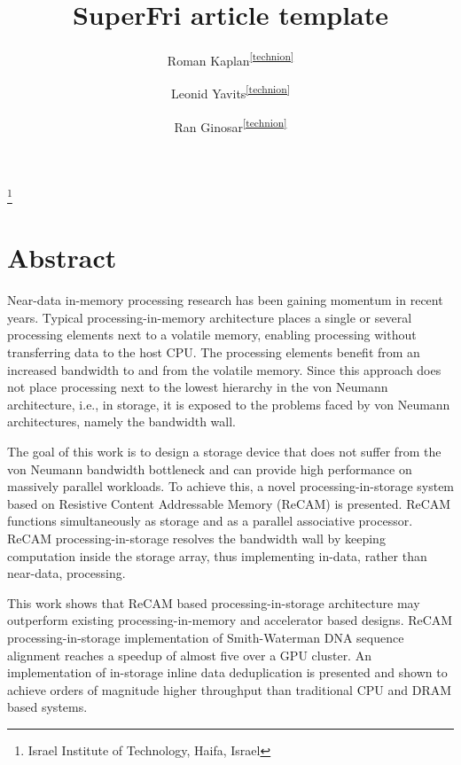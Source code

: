 \documentclass{superfri}
\begin{document}
\footnote{\label{technion}Israel Institute of Technology, Haifa, Israel}
\author{Roman Kaplan\textsuperscript{\ref{technion}} \and Leonid Yavits\textsuperscript{\ref{technion}} \and Ran Ginosar\textsuperscript{\ref{technion}}}

\title{SuperFri article template}

\maketitle{}

\begin{abstract}

\end{abstract}

\section*{Abstract}
\label{sec:abstract}
Near-data in-memory processing research has been gaining momentum in recent years. Typical processing-in-memory architecture places a single or several processing elements next to a volatile memory, enabling processing without transferring data to the host CPU. The processing elements benefit from an increased bandwidth to and from the volatile memory. Since this approach does not place processing next to the lowest hierarchy in the von Neumann architecture, i.e., in storage, it is exposed to the problems faced by von Neumann architectures, namely the bandwidth wall. 

The goal of this work is to design a storage device that does not suffer from the von Neumann bandwidth bottleneck and can provide high performance on massively parallel workloads. To achieve this, a novel processing-in-storage system based on Resistive Content Addressable Memory (ReCAM) is presented. ReCAM functions simultaneously as storage and as a parallel associative processor. ReCAM processing-in-storage resolves the bandwidth wall by keeping computation inside the storage array, thus implementing in-data, rather than near-data, processing. 

This work shows that ReCAM based processing-in-storage architecture may outperform existing processing-in-memory and accelerator based designs. ReCAM processing-in-storage implementation of Smith-Waterman DNA sequence alignment reaches a speedup of almost five over a GPU cluster. An implementation of in-storage inline data deduplication is presented and shown to achieve orders of magnitude higher throughput than traditional CPU and DRAM based systems.
\end{document}
